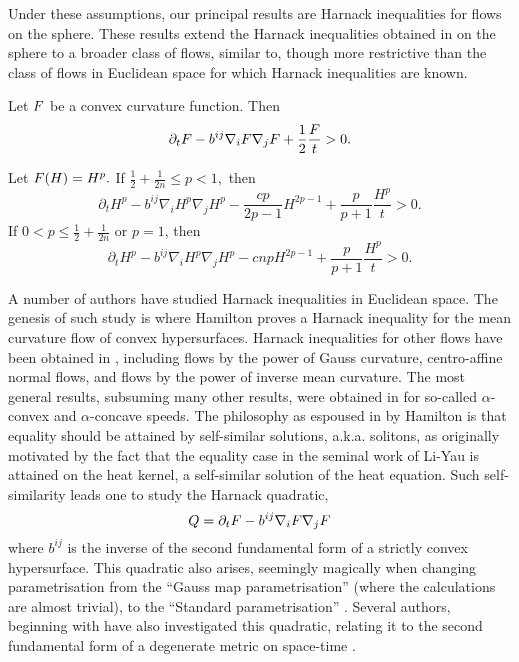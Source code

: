 \documentclass{amsart}
\begin{document}
Under these assumptions, our principal results are Harnack inequalities for flows on the sphere. These results extend the Harnack inequalities obtained in \cite{IvakiBryan:08/2015, bryanlouie} on the sphere to a broader class of flows, similar to, though more restrictive than the class of flows in Euclidean space \cite{MR1296393} for which Harnack inequalities are known.

\begin{theorem}\label{thm:harnack}
Let $F$ be a  convex curvature function. Then
\[
\partial_t F-b^{ij}\nabla_iF\nabla_jF+\frac{1}{2}\frac{F}{t}>0.
\]

Let $F(H)=H^{p}.$ If $\frac{1}{2}+\frac{1}{2n}\leq {p}< 1,$ then
\[
\partial_t H^{p} - b^{ij}\nabla_iH^{p}\nabla_jH^{p} - \frac{c {p}}{2{p}-1}H^{2{p}-1} + \frac{{p}}{{p}+1} \frac{H^{p}}{t} > 0.
\]
If $0<{p}\leq \frac{1}{2} + \frac{1}{2n}$ or $p=1$, then
\[
\partial_t H^{p} - b^{ij}\nabla_iH^{p}\nabla_jH^{p} - c n{p}H^{2{p}-1} + \frac{{p}}{{p}+1} \frac{H^{p}}{t} > 0.
\]
\end{theorem}

A number of authors have studied Harnack inequalities in Euclidean space. The genesis of such study is \cite{MR1316556} where Hamilton proves a Harnack inequality for the mean curvature flow of convex hypersurfaces. Harnack inequalities for other flows have been obtained in \cite{MR1100812,ivaki2015centro,ivaki2015convex, MR2813400, MR1480081}, including flows by the power of Gauss curvature, centro-affine normal flows, and flows by the power of inverse mean curvature. The most general results, subsuming many other results, were obtained in \cite{MR1296393} for so-called \(\alpha\)-convex and \(\alpha\)-concave speeds. The philosophy as espoused in \cite{MR1316556} by Hamilton is that equality should be attained by self-similar solutions, a.k.a. solitons, as originally motivated by the fact that the equality case in the seminal work of Li-Yau \cite{MR834612} is attained on the heat kernel, a self-similar solution of the heat equation. Such self-similarity leads one to study the Harnack quadratic,
\begin{equation}
\label{eq:harnack_quadratic}
Q = \partial_t F - b^{ij} \nabla_i F \nabla_j F
\end{equation}
where \(b^{ij}\) is the inverse of the second fundamental form of a strictly convex hypersurface. This quadratic also arises, seemingly magically when changing parametrisation from the ``Gauss map parametrisation'' (where the calculations are almost trivial), to the ``Standard parametrisation'' \cite{MR1296393}. Several authors, beginning with \cite{MR1856176} have also investigated this quadratic, relating it to the second fundamental form of a degenerate metric on space-time \cite{kotschwarharnack,2013arXiv1301.1543H}.
\end{document}
